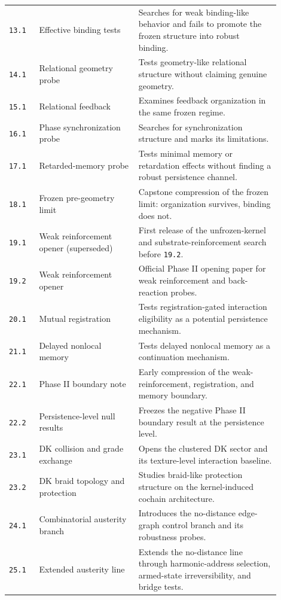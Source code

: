 \documentclass[11pt]{article}
\begin{document}
\begin{longtable}{p{0.10\linewidth}p{0.33\linewidth}p{0.47\linewidth}}
\texttt{13.1} & Effective binding tests & Searches for weak binding-like behavior and fails to promote the frozen structure into robust binding. \\
\texttt{14.1} & Relational geometry probe & Tests geometry-like relational structure without claiming genuine geometry. \\
\texttt{15.1} & Relational feedback & Examines feedback organization in the same frozen regime. \\
\texttt{16.1} & Phase synchronization probe & Searches for synchronization structure and marks its limitations. \\
\texttt{17.1} & Retarded-memory probe & Tests minimal memory or retardation effects without finding a robust persistence channel. \\
\texttt{18.1} & Frozen pre-geometry limit & Capstone compression of the frozen limit: organization survives, binding does not. \\
\texttt{19.1} & Weak reinforcement opener (superseded) & First release of the unfrozen-kernel and substrate-reinforcement search before \texttt{19.2}. \\
\texttt{19.2} & Weak reinforcement opener & Official Phase II opening paper for weak reinforcement and back-reaction probes. \\
\texttt{20.1} & Mutual registration & Tests registration-gated interaction eligibility as a potential persistence mechanism. \\
\texttt{21.1} & Delayed nonlocal memory & Tests delayed nonlocal memory as a continuation mechanism. \\
\texttt{22.1} & Phase II boundary note & Early compression of the weak-reinforcement, registration, and memory boundary. \\
\texttt{22.2} & Persistence-level null results & Freezes the negative Phase II boundary result at the persistence level. \\
\texttt{23.1} & DK collision and grade exchange & Opens the clustered DK sector and its texture-level interaction baseline. \\
\texttt{23.2} & DK braid topology and protection & Studies braid-like protection structure on the kernel-induced cochain architecture. \\
\texttt{24.1} & Combinatorial austerity branch & Introduces the no-distance edge-graph control branch and its robustness probes. \\
\texttt{25.1} & Extended austerity line & Extends the no-distance line through harmonic-address selection, armed-state irreversibility, and bridge tests. \\

\end{longtable}
\end{document}

